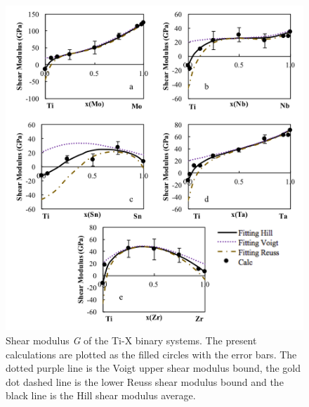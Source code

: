 \pagebreak
\begin{figure}[H]
	\centering
	\includegraphics[width=\textwidth]{Chapter-5/Figures/tixshear.png}
	\caption{Shear modulus \textit{G} of the Ti-X binary systems. The present calculations are plotted as the filled circles with the error bars. The dotted purple line is the Voigt upper shear modulus bound, the gold dot dashed line is the lower Reuss shear modulus bound and the black line is the Hill shear modulus average.}
	\label{Ch5-figure:tixshear}
\end{figure}

